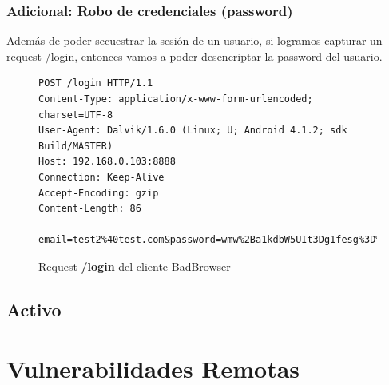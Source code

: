 \documentclass[11pt, a4paper, twoside]{article}
\begin{document}
\subsubsection{Adicional: Robo de credenciales (password)}
Además de poder secuestrar la sesión de un usuario, si logramos capturar un request /login, entonces vamos a poder desencriptar la password del usuario.

\begin{figure}[H]
\begin{Verbatim}[frame=single,fontsize=\small]
POST /login HTTP/1.1
Content-Type: application/x-www-form-urlencoded; charset=UTF-8
User-Agent: Dalvik/1.6.0 (Linux; U; Android 4.1.2; sdk Build/MASTER)
Host: 192.168.0.103:8888
Connection: Keep-Alive
Accept-Encoding: gzip
Content-Length: 86

email=test2%40test.com&password=wmw%2Ba1kdbW5UIt3Dg1fesg%3D%3D%0A&uuid=000000000000000
\end{Verbatim}
\caption{Request \textbf{\color{red}/login} del cliente BadBrowser}
\label{fig:sniffer-login}
\end{figure}

\subsection{Activo}

%
%
\clearpage
{}
\section{Vulnerabilidades Remotas}
\end{document}
